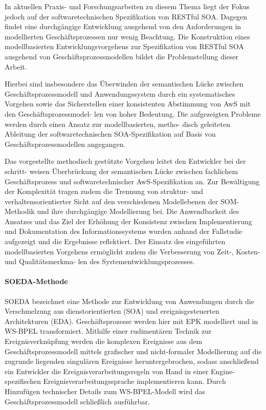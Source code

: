 In aktuellen Praxis- und Forschungsarbeiten zu diesem Thema liegt der Fokus jedoch auf der softwaretechnischen Spezifikation von RESTful SOA. Dagegen findet eine durchgängige Entwicklung ausgehend von den Anforderungen in modellierten Geschäftsprozessen nur wenig Beachtung.
Die Konstruktion eines modellbasierten Entwicklungsvorgehens zur Spezifikation von RESTful SOA ausgehend von Geschäftsprozessmodellen bildet die Problemstellung dieser Arbeit.

Hierbei sind insbesondere das Überwinden der semantischen Lücke zwischen Geschäftsprozessmodell und Anwendungssystem durch ein systematisches Vorgehen sowie das Sicherstellen einer konsistenten Abstimmung von AwS mit den Geschäftsprozessmodel- len von hoher Bedeutung. Die aufgezeigten Probleme werden durch einen Ansatz zur modellbasierten, metho- disch geleiteten Ableitung der softwaretechnischen SOA-Spezifikation auf Basis von Geschäftsprozessmodellen angegangen.

Das vorgestellte methodisch gestützte Vorgehen leitet den Entwickler bei der schritt- weisen Überbrückung der semantischen Lücke zwischen fachlichem Geschäftsprozess und softwaretechnischer AwS-Spezifikation an. Zur Bewältigung der Komplexität tragen zudem die Trennung von struktur- und verhaltensorientierter Sicht auf den verschiedenen Modellebenen der SOM-Methodik und ihre durchgängige Modellierung bei. Die Anwendbarkeit des Ansatzes und das Ziel der Erhöhung der Konsistenz zwischen Implementierung und Dokumentation des Informationssystems wurden anhand der Fallstudie aufgezeigt und die Ergebnisse reflektiert. Der Einsatz des eingeführten modellbasierten Vorgehens ermöglicht zudem die Verbesserung von Zeit-, Kosten- und Qualitätsmerkma- len des Systementwicklungsprozesses.
\cite{Wolf.2016}

\paragraph{SOEDA-Methode}
SOEDA bezeichnet eine Methode zur Entwicklung von Anwendungen durch die Verschmelzung aus dienstorientierten (SOA) und ereignisgesteuerten Architekturen (EDA). Geschäftsprozesse werden hier mit EPK modelliert und in WS-BPEL transformiert. Mithilfe einer rudimentären Technik zur Ereignisverknüpfung werden die komplexen Ereignisse aus dem Geschäftsprozessmodell mittels grafischer und nicht-formaler Modellierung auf die zugrunde liegenden singulären Ereignisse heruntergebrochen, sodass anschließend ein Entwickler die Ereignisverarbeitungsregeln von Hand in einer Engine-spezifischen Ereignisverarbeitungssprache implementieren kann. Durch Hinzufügen technischer Details zum WS-BPEL-Modell wird das Geschäftsprozessmodell schließlich ausführbar.

